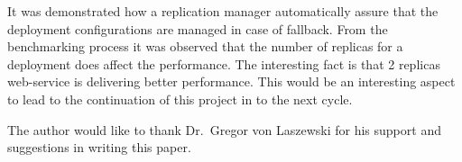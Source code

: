 It was demonstrated how a replication manager automatically assure that the
deployment configurations are managed in case of fallback. From the
benchmarking process it was observed that the number of replicas for a
deployment does affect the performance. The interesting fact is that 2
replicas web-service is delivering better performance. This would be an
interesting aspect to lead to the continuation of this project in to the next
cycle. 


\begin{acks}
The author would like to thank Dr.\ Gregor von Laszewski for his support and
suggestions in writing this paper.
\end{acks}






